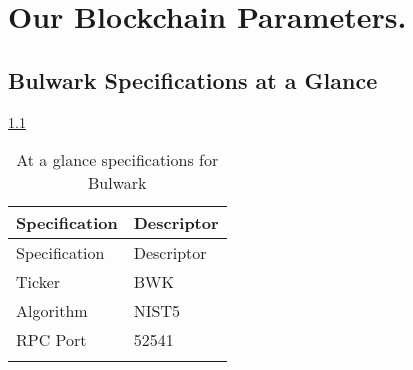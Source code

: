 \documentclass[11pt,a4paperpaper,]{report}
\begin{document}
\chapter{Our Blockchain Parameters.}\label{our-blockchain-parameters.}

\section{Bulwark Specifications at a
Glance}\label{bulwark-specifications-at-a-glance}

\ref{ref_a_table}

\begin{longtable}[]{@{}ll@{}}
\caption{At a glance specifications for Bulwark
\label{ref_a_table}}\tabularnewline
\toprule
\begin{minipage}[b]{0.35\columnwidth}\raggedright\strut
Specification\strut
\end{minipage} & \begin{minipage}[b]{0.59\columnwidth}\raggedright\strut
Descriptor\strut
\end{minipage}\tabularnewline
\midrule
\endfirsthead
\toprule
\begin{minipage}[b]{0.35\columnwidth}\raggedright\strut
Specification\strut
\end{minipage} & \begin{minipage}[b]{0.59\columnwidth}\raggedright\strut
Descriptor\strut
\end{minipage}\tabularnewline
\midrule
\endhead
\begin{minipage}[t]{0.35\columnwidth}\raggedright\strut
Ticker\strut
\end{minipage} & \begin{minipage}[t]{0.59\columnwidth}\raggedright\strut
BWK\strut
\end{minipage}\tabularnewline
\begin{minipage}[t]{0.35\columnwidth}\raggedright\strut
Algorithm\strut
\end{minipage} & \begin{minipage}[t]{0.59\columnwidth}\raggedright\strut
NIST5\strut
\end{minipage}\tabularnewline
\begin{minipage}[t]{0.35\columnwidth}\raggedright\strut
RPC Port\strut
\end{minipage} & \begin{minipage}[t]{0.59\columnwidth}\raggedright\strut
52541\strut
\end{minipage}\tabularnewline
\begin{minipage}[t]{0.35\columnwidth}\raggedright\strut

\end{minipage}
\end{longtable}
\end{document}
